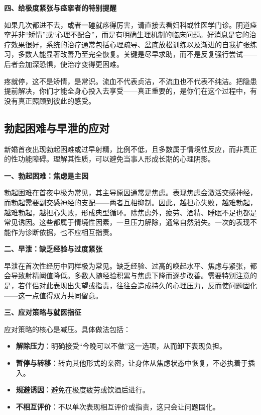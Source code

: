 \documentclass[12pt,UTF8]{ctexbook}
\begin{document}
\textbf{四、给极度紧张与痉挛者的特别提醒}

如果几次都进不去，或者一碰就疼得厉害，请直接去看妇科或性医学门诊。阴道痉挛并非“矫情”或“心理不配合”，而是有明确生理机制的临床问题。好消息是它的治疗效果很好，系统的治疗通常包括心理疏导、盆底放松训练以及渐进的自我扩张练习，多数人能显著改善乃至完全恢复。关键是尽早求助，而不是反复强行尝试——后者会加深恐惧，使治疗变得更困难。

\begin{tcolorbox}[colback=pink!5!white,colframe=red!50!black,title=贴心小叮咛]
疼就停，这不是矫情，是常识。流血不代表贞洁，不流血也不代表不纯洁。把隐患提前解决，你们才能全身心投入去享受——真正重要的，是你们在这个过程中，有没有真正照顾到彼此的感受。
\end{tcolorbox}

\subsection{勃起困难与早泄的应对}

新婚首夜出现勃起困难或过早射精，比例不低，且多数属于情境性反应，而非真正的性功能障碍。理解其性质，可以避免当事人形成长期的心理阴影。

\textbf{一、勃起困难：焦虑是主因}

勃起困难在首夜中极为常见，其主导原因通常是焦虑。表现焦虑会激活交感神经，而勃起需要副交感神经的支配——两者互相抑制。因此，越担心失败，越难勃起，越难勃起，越担心失败，形成典型循环。除焦虑外，疲劳、酒精、睡眠不足也都是常见诱因。这些都属于情境性因素，一旦压力解除，通常自然消失。一次的表现不能作为诊断依据，也不应相互指责。

\textbf{二、早泄：缺乏经验与过度紧张}

早泄在首次性经历中同样极为常见。缺乏经验、过高的唤起水平、焦虑与紧张，都会导致射精阈值降低。多数人随经验积累与焦虑下降而逐步改善。需要特别注意的是，若伴侣对此表现出失望或指责，往往会造成持久的心理压力，反而使问题固化——这一点值得双方共同留意。

\textbf{三、应对策略与就医指征}

应对策略的核心是减压。具体做法包括：

\begin{itemize}
\item \textbf{解除压力}：明确接受“今晚可以不做”这一选项，从而卸下表现负担。
\item \textbf{暂停与转移}：转向其他形式的亲密，让身体从焦虑状态中恢复，不必执着于插入。
\item \textbf{规避诱因}：避免在极度疲劳或饮酒后进行。
\item \textbf{不相互评价}：不以单次表现相互评价或指责，这只会让问题固化。
\end{itemize}
\end{document}
